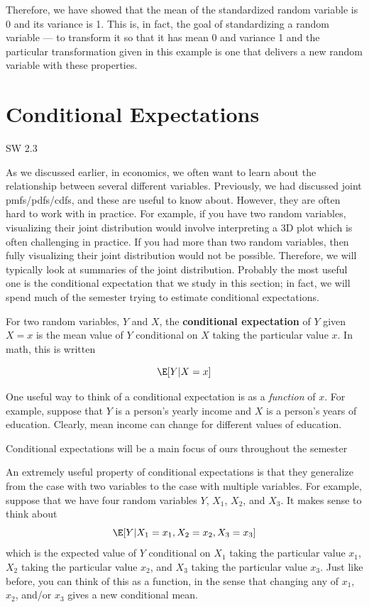 \documentclass[
  letterpaper,
  DIV=11,
  numbers=noendperiod]{scrreprt}
\begin{document}
Therefore, we have showed that the mean of the standardized random
variable is 0 and its variance is 1. This is, in fact, the goal of
standardizing a random variable --- to transform it so that it has mean
0 and variance 1 and the particular transformation given in this example
is one that delivers a new random variable with these properties.

\section{Conditional Expectations}\label{conditional-expectations}

SW 2.3

As we discussed earlier, in economics, we often want to learn about the
relationship between several different variables. Previously, we had
discussed joint pmfs/pdfs/cdfs, and these are useful to know about.
However, they are often hard to work with in practice. For example, if
you have two random variables, visualizing their joint distribution
would involve interpreting a 3D plot which is often challenging in
practice. If you had more than two random variables, then fully
visualizing their joint distribution would not be possible. Therefore,
we will typically look at summaries of the joint distribution. Probably
the most useful one is the conditional expectation that we study in this
section; in fact, we will spend much of the semester trying to estimate
conditional expectations.

For two random variables, \(Y\) and \(X\), the \textbf{conditional
expectation} of \(Y\) given \(X=x\) is the mean value of \(Y\)
conditional on \(X\) taking the particular value \(x\). In math, this is
written

\[
  \E[Y|X=x]
\]

One useful way to think of a conditional expectation is as a
\emph{function} of \(x\). For example, suppose that \(Y\) is a person's
yearly income and \(X\) is a person's years of education. Clearly, mean
income can change for different values of education.

Conditional expectations will be a main focus of ours throughout the
semester

An extremely useful property of conditional expectations is that they
generalize from the case with two variables to the case with multiple
variables. For example, suppose that we have four random variables
\(Y\), \(X_1\), \(X_2\), and \(X_3\). It makes sense to think about \[
  \E[Y|X_1=x_1, X_2=x_2, X_3=x_3]
\] which is the expected value of \(Y\) conditional on \(X_1\) taking
the particular value \(x_1\), \(X_2\) taking the particular value
\(x_2\), and \(X_3\) taking the particular value \(x_3\). Just like
before, you can think of this as a function, in the sense that changing
any of \(x_1\), \(x_2\), and/or \(x_3\) gives a new conditional mean.
\end{document}

